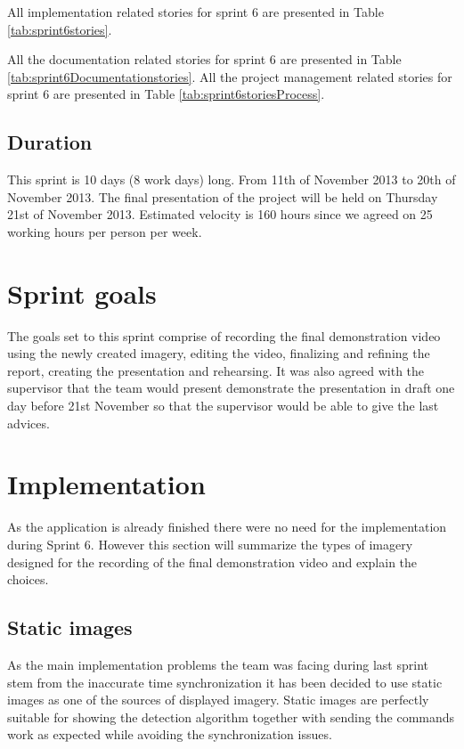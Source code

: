 All implementation related stories for sprint 6 are presented in Table \ref{tab:sprint6stories}.

All the documentation related stories for sprint 6 are presented in Table \ref{tab:sprint6Documentationstories}. 
 All the project management related stories for sprint 6 are presented in Table \ref{tab:sprint6storiesProcess}.


\subsection{Duration}
This sprint is 10 days (8 work days) long. From 11th of November 2013 to 20th of November 2013. The final presentation of the project will be held on Thursday 21st of November 2013.
Estimated velocity is 160 hours since we agreed on 25 working hours per person per week. 

\section{Sprint goals}
The goals set to this sprint comprise of recording the final demonstration video using the newly created imagery, editing the video, finalizing and refining the report, creating the presentation and rehearsing. It was also agreed with the supervisor that the team would present demonstrate the presentation in draft one day before 21st November so that the supervisor would be able to give the last advices.

\section{Implementation}
As the application is already finished there were no need for the implementation during Sprint 6. However this section will summarize the types of imagery designed for the recording of the final demonstration video and explain the choices.

\subsection{Static images}
As the main implementation problems the team was facing during last sprint stem from the inaccurate time synchronization it has been decided to use static images as one of the sources of displayed imagery. Static images are perfectly suitable for showing the detection algorithm together with sending the commands work as expected while avoiding the synchronization issues.

